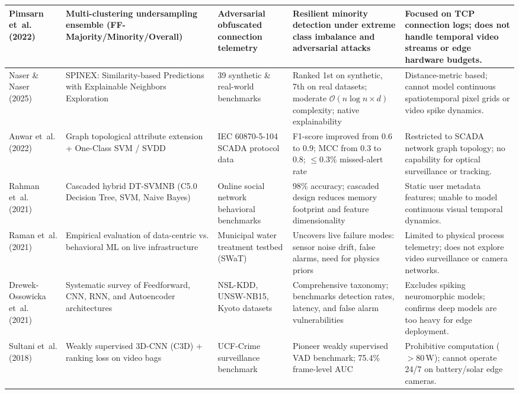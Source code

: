 \documentclass[12pt,a4paper]{report}
\begin{document}
\begin{table}[H]
{\begin{tabular}{|p{3.2cm}|p{3.8cm}|p{3.2cm}|p{4.2cm}|p{4.5cm}|}
\hline
Pimsarn et~al. (2022)~\cite{ref_pimsarn2022_imbalance} & Multi-clustering undersampling ensemble (FF-Majority/Minority/Overall) & Adversarial obfuscated connection telemetry & Resilient minority detection under extreme class imbalance and adversarial attacks & Focused on TCP connection logs; does not handle temporal video streams or edge hardware budgets. \\
\hline
Naser \& Naser (2025)~\cite{ref_naser2025_spinex} & SPINEX: Similarity-based Predictions with Explainable Neighbors Exploration & 39 synthetic \& real-world benchmarks & Ranked 1st on synthetic, 7th on real datasets; moderate $\mathcal{O}(n \log n \times d)$ complexity; native explainability & Distance-metric based; cannot model continuous spatiotemporal pixel grids or video spike dynamics. \\
\hline
Anwar et~al. (2022)~\cite{ref_anwar2022_scada} & Graph topological attribute extension + One-Class SVM / SVDD & IEC 60870-5-104 SCADA protocol data & F1-score improved from 0.6 to 0.9; MCC from 0.3 to 0.8; $\le 0.3\%$ missed-alert rate & Restricted to SCADA network graph topology; no capability for optical surveillance or tracking. \\
\hline
Rahman et~al. (2021)~\cite{ref_rahman2021_social} & Cascaded hybrid DT-SVMNB (C5.0 Decision Tree, SVM, Naive Bayes) & Online social network behavioral benchmarks & 98\% accuracy; cascaded design reduces memory footprint and feature dimensionality & Static user metadata features; unable to model continuous visual temporal dynamics. \\
\hline
Raman et~al. (2021)~\cite{ref_raman2021_ics} & Empirical evaluation of data-centric vs. behavioral ML on live infrastructure & Municipal water treatment testbed (SWaT) & Uncovers live failure modes: sensor noise drift, false alarms, need for physics priors & Limited to physical process telemetry; does not explore video surveillance or camera networks. \\
\hline
Drewek-Ossowicka et~al. (2021)~\cite{ref_drewek2021_survey} & Systematic survey of Feedforward, CNN, RNN, and Autoencoder architectures & NSL-KDD, UNSW-NB15, Kyoto datasets & Comprehensive taxonomy; benchmarks detection rates, latency, and false alarm vulnerabilities & Excludes spiking neuromorphic models; confirms deep models are too heavy for edge deployment. \\
\hline
Sultani et~al. (2018)~\cite{ref_sultani2018_ucfcrime} & Weakly supervised 3D-CNN (C3D) + ranking loss on video bags & UCF-Crime surveillance benchmark & Pioneer weakly supervised VAD benchmark; 75.4\% frame-level AUC & Prohibitive computation ($>80\,\text{W}$); cannot operate 24/7 on battery/solar edge cameras. \\

\end{tabular}}
\end{table}
\end{document}
